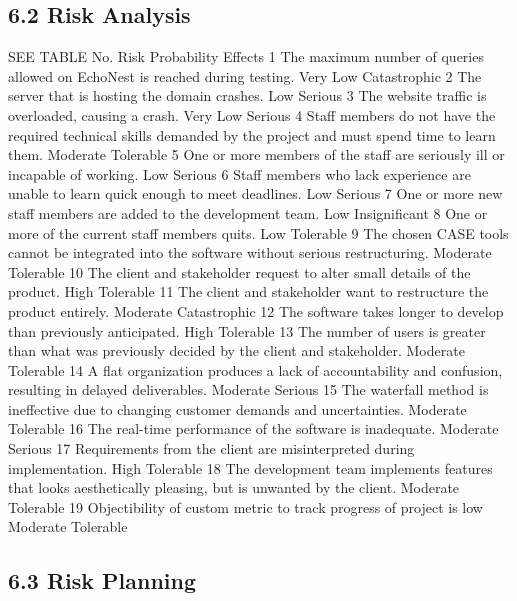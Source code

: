\documentclass[]{article}
\begin{document}
\subsection{6.2 Risk Analysis}\label{risk-analysis}

SEE TABLE No. Risk Probability Effects 1 The maximum number of queries
allowed on EchoNest is reached during testing. Very Low Catastrophic 2
The server that is hosting the domain crashes. Low Serious 3 The website
traffic is overloaded, causing a crash. Very Low Serious 4 Staff members
do not have the required technical skills demanded by the project and
must spend time to learn them. Moderate Tolerable 5 One or more members
of the staff are seriously ill or incapable of working. Low Serious 6
Staff members who lack experience are unable to learn quick enough to
meet deadlines. Low Serious 7 One or more new staff members are added to
the development team. Low Insignificant 8 One or more of the current
staff members quits. Low Tolerable 9 The chosen CASE tools cannot be
integrated into the software without serious restructuring. Moderate
Tolerable 10 The client and stakeholder request to alter small details
of the product. High Tolerable 11 The client and stakeholder want to
restructure the product entirely. Moderate Catastrophic 12 The software
takes longer to develop than previously anticipated. High Tolerable 13
The number of users is greater than what was previously decided by the
client and stakeholder. Moderate Tolerable 14 A flat organization
produces a lack of accountability and confusion, resulting in delayed
deliverables. Moderate Serious 15 The waterfall method is ineffective
due to changing customer demands and uncertainties. Moderate Tolerable
16 The real-time performance of the software is inadequate. Moderate
Serious 17 Requirements from the client are misinterpreted during
implementation. High Tolerable 18 The development team implements
features that looks aesthetically pleasing, but is unwanted by the
client. Moderate Tolerable 19 Objectibility of custom metric to track
progress of project is low Moderate Tolerable

\subsection{6.3 Risk Planning}\label{risk-planning}
\end{document}
